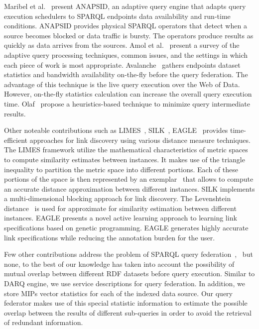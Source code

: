 \documentclass{sig-alternate}  %
\begin{document}
Maribel et al.~\cite{key-21} present ANAPSID, an adaptive query engine
that adapts query execution schedulers to SPARQL endpoints data
availability and run-time conditions. ANAPSID provides physical SPARQL
operators that detect when a source becomes blocked or data traffic
is bursty. The operators produce results as
quickly as data arrives from the sources. Amol et al.~\cite{key-17} present a survey of the adaptive query processing
techniques, common issues, and the settings in which each piece of work is most appropriate. 
Avalanche~\cite{key-24} gathers endpoints dataset statistics and bandwidth availability on-the-fly before the query federation. The advantage of this technique is the live query execution over the Web of Data. However, on-the-fly statistics calculation can increase the overall query execution time. Olaf~\cite{key-25} propose a heuristics-based technique to minimize query intermediate
results. 

Other noteable contributions such as LIMES~\cite{key-26}, SILK~\cite{key-27}, EAGLE~\cite{key-28} provides time-efficient approaches for link discovery using
various distance measure techniques. The LIMES framework utilize the mathematical
characteristics of metric spaces to compute similarity estimates between
instances. It makes use of the triangle inequality to partition the
metric space into different portions. Each of these portions of the
space is then represented by an exemplar~\cite{key-33} that allows to compute
an accurate distance approximation between different instances. SILK
implements a multi-dimensional blocking approach for link discovery.
The Levenshtein distance~\cite{key-34} is used for approximate for similarity
estimation between different instances. EAGLE presents a novel active
learning approach to learning link specifications based on genetic programming.
EAGLE generates highly accurate link specifications while reducing the
annotation burden for the user. 

Few other contributions address the problem of SPARQL query federation~\cite{key-22},~\cite{key-23} but none, to the best of our knowledge has taken into account the possibility of mutual overlap between different RDF datasets before query execution. Similar to DARQ engine, we use service
descriptions for query federation. In addition, we store MIPs vector
statistics for each of the indexed data source. Our query federator makes
use of this special statistic information to estimate the possible
overlap between the results of different sub-queries in order to avoid the retrieval of redundant information.
\end{document}

